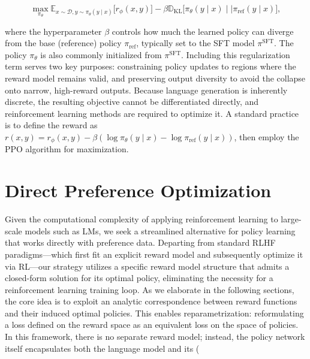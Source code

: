 \begin{equation}\label{eq:RL}
\max_{\pi_{\theta}}  \mathbb{E}_{x\sim \mathcal{D}, y\sim \pi_{\theta}(y \mid x)}\bigl[r_{\phi}(x, y)\bigr] - \beta\mathbb{D}_{\textrm{KL}}\bigl[\pi_{\theta}(y\mid x)\mid \mid \pi_\text{ref}(y\mid x)\bigr],
\end{equation}

where the hyperparameter $\beta$ controls how much the learned policy can diverge from the base (reference) policy $\pi_\text{ref}$, typically set to the SFT model $\pi^\text{SFT}$. The policy $\pi_\theta$ is also commonly initialized from $\pi^\text{SFT}$. Including this regularization term serves two key purposes: constraining policy updates to regions where the reward model remains valid, and preserving output diversity to avoid the collapse onto narrow, high-reward outputs. Because language generation is inherently discrete, the resulting objective cannot be differentiated directly, and reinforcement learning methods are required to optimize it. A standard practice \citep{ziegler2020finetuning, stiennon2022learning, bai2022training, ouyang2022training} is to define the reward as ${r(x, y) = r_{\phi}(x, y) -\beta (\log \pi_{\theta}(y\mid x) - \log \pi_\text{ref}(y\mid x))}$, then employ the PPO algorithm \cite{schulman2017proximal} for maximization.

\section{Direct Preference Optimization}\label{sec:DPO}

Given the computational complexity of applying reinforcement learning to large-scale models such as LMs, we seek a streamlined alternative for policy learning that works directly with preference data. Departing from standard RLHF paradigms—which first fit an explicit reward model and subsequently optimize it via RL—our strategy utilizes a specific reward model structure that admits a closed-form solution for its optimal policy, eliminating the necessity for a reinforcement learning training loop. As we elaborate in the following sections, the core idea is to exploit an analytic correspondence between reward functions and their induced optimal policies. This enables reparametrization: reformulating a loss defined on the reward space as an equivalent loss on the space of policies. In this framework, there is no separate reward model; instead, the policy network itself encapsulates both the language model and its (

